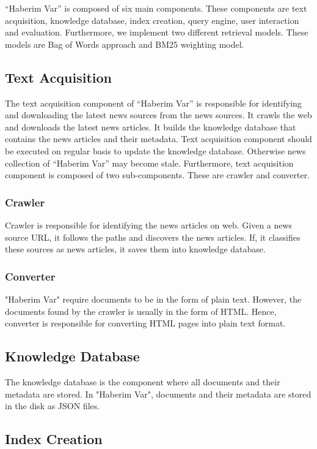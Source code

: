 \documentclass[conference]{IEEEtran}
\begin{document}
“Haberim Var” is composed of six main components. These components are text acquisition, knowledge database, index creation, query engine, user interaction and evaluation. Furthermore, we implement two different retrieval models. These models are Bag of Words approach and BM25 weighting model.

\subsection{Text Acquisition}

The text acquisition component of “Haberim Var” is responsible for identifying and downloading the latest news sources from the news sources. It crawls the web and downloads the latest news articles. It builds the knowledge database that contains the news articles and their metadata. Text acquisition component should be executed on regular basis to update the knowledge database. Otherwise news collection of “Haberim Var” may become stale. Furthermore, text acquisition component is composed of two sub-components. These are crawler and converter.

\subsubsection{Crawler}
Crawler is responsible for identifying the news articles on web. Given a news source URL, it follows the paths and discovers the news articles. If, it classifies these sources as news articles, it saves them into knowledge database.

\subsubsection{Converter}
"Haberim Var" require documents to be in the form of plain text. However, the documents found by the crawler is usually in the form of HTML. Hence, converter is responsible for converting HTML pages into plain text format.

\subsection{Knowledge Database}

The knowledge database is the component where all documents and their metadata are stored. In "Haberim Var", documents and their metadata are stored in the disk as JSON files.

\subsection{Index Creation}
\end{document}

